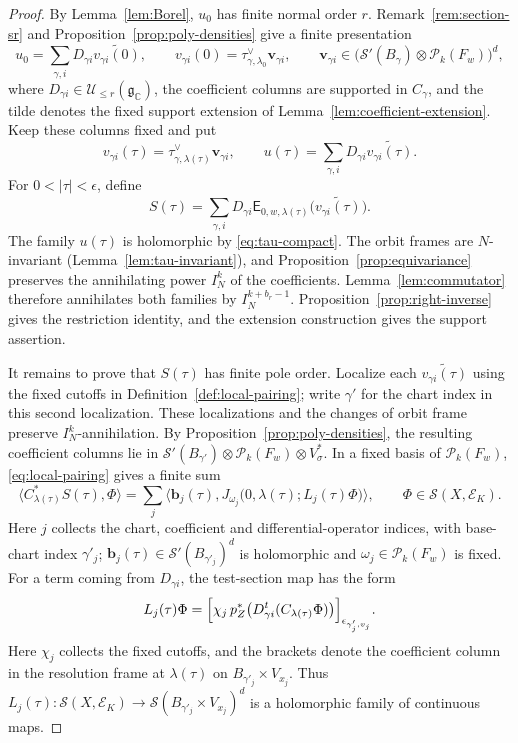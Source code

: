 \documentclass[a4paper,12pt]{amsart}
\numberwithin{equation}{section}
\theoremstyle{definition}
\theoremstyle{remark}
\newcommand{\C}{\mathbb C}
\newcommand{\fg}{\mathfrak g}
\newcommand{\IN}{I_N}
\newcommand{\mcU}{\mathcal U}
\newcommand{\mcS}{\mathcal S}
\newcommand{\mcE}{\mathcal E}
\newcommand{\mcP}{\mathcal P}
\newcommand{\E}{\mathsf E}
\begin{document}
\begin{proof}
By Lemma~\ref{lem:Borel}, $u_0$ has finite normal order $r$. Remark~\ref{rem:section-sr} and Proposition~\ref{prop:poly-densities} give a finite presentation
\[
 u_0=\sum_{\gamma,i}D_{\gamma i}\widetilde{v_{\gamma i}(0)},\qquad
 v_{\gamma i}(0)=\tau_{\gamma,\lambda_0}^\vee\mathbf v_{\gamma i},\qquad
 \mathbf v_{\gamma i}\in
 \bigl(\mcS'(B_\gamma)\otimes\mcP_k(F_w)\bigr)^d,
\]
where $D_{\gamma i}\in\mcU_{\le r}(\fg_\C)$, the coefficient columns are supported in $C_\gamma$, and the tilde denotes the fixed support extension of Lemma~\ref{lem:coefficient-extension}. Keep these columns fixed and put
\[
 v_{\gamma i}(\tau)=\tau_{\gamma,\lambda(\tau)}^\vee\mathbf v_{\gamma i},\qquad
 u(\tau)=\sum_{\gamma,i}D_{\gamma i}\widetilde{v_{\gamma i}(\tau)}.
\]
For $0<|\tau|<\epsilon$, define
\[
 S(\tau)=\sum_{\gamma,i}D_{\gamma i}
 \E_{0,w,\lambda(\tau)}\bigl(\widetilde{v_{\gamma i}(\tau)}\bigr).
\]
The family $u(\tau)$ is holomorphic by \eqref{eq:tau-compact}. The orbit frames are $N$-invariant (Lemma~\ref{lem:tau-invariant}), and Proposition~\ref{prop:equivariance} preserves the annihilating power $\IN^k$ of the coefficients. Lemma~\ref{lem:commutator} therefore annihilates both families by $\IN^{k+b_r-1}$. Proposition~\ref{prop:right-inverse} gives the restriction identity, and the extension construction gives the support assertion.

It remains to prove that $S(\tau)$ has finite pole order. Localize each $\widetilde{v_{\gamma i}(\tau)}$ using the fixed cutoffs in Definition~\ref{def:local-pairing}; write $\gamma'$ for the chart index in this second localization. These localizations and the changes of orbit frame preserve $\IN^k$-annihilation. By Proposition~\ref{prop:poly-densities}, the resulting coefficient columns lie in $\mcS'(B_{\gamma'})\otimes\mcP_k(F_w)\otimes V_\sigma^*$. In a fixed basis of $\mcP_k(F_w)$, \eqref{eq:local-pairing} gives a finite sum
\[
 \bigl\langle C_{\lambda(\tau)}^*S(\tau),\Phi\bigr\rangle
 =\sum_j\bigl\langle\mathbf b_j(\tau),
 J_{\omega_j}\bigl(0,\lambda(\tau);L_j(\tau)\Phi\bigr)\bigr\rangle,
 \qquad \Phi\in\mcS(X,\mcE_K).
\]
Here $j$ collects the chart, coefficient and differential-operator indices, with base-chart index $\gamma'_j$; $\mathbf b_j(\tau)\in\mcS'(B_{\gamma'_j})^d$ is holomorphic and $\omega_j\in\mcP_k(F_w)$ is fixed. For a term coming from $D_{\gamma i}$, the test-section map has the form
\[
 L_j(\tau)\Phi
 =\Bigl[\chi_j\,p_Z^*\bigl(D_{\gamma i}^{t}
       (C_{\lambda(\tau)}\Phi)\bigr)\Bigr]_{\epsilon_{\gamma'_j,v_j}}.
\]
Here $\chi_j$ collects the fixed cutoffs, and the brackets denote the coefficient column in the resolution frame at $\lambda(\tau)$ on $B_{\gamma'_j}\times V_{x_j}$. Thus $L_j(\tau):\mcS(X,\mcE_K)\to\mcS(B_{\gamma'_j}\times V_{x_j})^d$ is a holomorphic family of continuous maps.


\end{proof}
\end{document}
